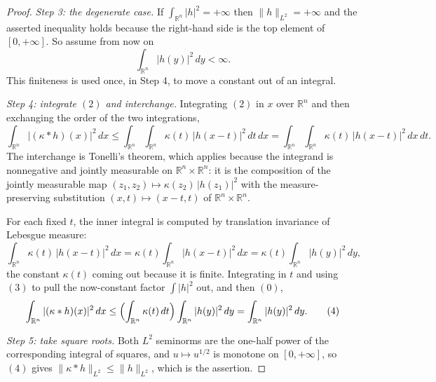\begin{proof}
\emph{Step 3: the degenerate case.}
If $\int_{\mathbb{R}^n}|h|^2 = +\infty$ then $\|h\|_{L^2} = +\infty$ and the
asserted inequality holds because the right-hand side is the top element of
$[0,+\infty]$.  So assume from now on
\begin{equation*}
  \int_{\mathbb{R}^n} |h(y)|^2 \, dy < \infty . \tag{3}
\end{equation*}
This finiteness is used once, in Step 4, to move a constant out of an integral.

\emph{Step 4: integrate $(2)$ and interchange.}
Integrating $(2)$ in $x$ over $\mathbb{R}^n$ and then exchanging the order of the
two integrations,
\[
  \int_{\mathbb{R}^n} |(\kappa*h)(x)|^2 \, dx
    \leq \int_{\mathbb{R}^n}\!\!\int_{\mathbb{R}^n} \kappa(t)\,|h(x-t)|^2 \, dt\, dx
    = \int_{\mathbb{R}^n}\!\!\int_{\mathbb{R}^n} \kappa(t)\,|h(x-t)|^2 \, dx\, dt .
\]
The interchange is Tonelli's theorem, which applies because the integrand is
nonnegative and jointly measurable on $\mathbb{R}^n \times \mathbb{R}^n$: it is
the composition of the jointly measurable map
$(z_1,z_2) \mapsto \kappa(z_2)\,|h(z_1)|^2$ with the measure-preserving
substitution $(x,t) \mapsto (x-t,t)$ of $\mathbb{R}^n\times\mathbb{R}^n$.

For each fixed $t$, the inner integral is computed by translation invariance of
Lebesgue measure:
\[
  \int_{\mathbb{R}^n} \kappa(t)\,|h(x-t)|^2 \, dx
    = \kappa(t) \int_{\mathbb{R}^n} |h(x-t)|^2 \, dx
    = \kappa(t) \int_{\mathbb{R}^n} |h(y)|^2 \, dy ,
\]
the constant $\kappa(t)$ coming out because it is finite.  Integrating in $t$ and
using $(3)$ to pull the now-constant factor $\int |h|^2$ out, and then $(0)$,
\begin{equation*}
  \int_{\mathbb{R}^n} |(\kappa*h)(x)|^2 \, dx
    \leq \Bigl(\int_{\mathbb{R}^n} \kappa(t)\,dt\Bigr)
        \int_{\mathbb{R}^n} |h(y)|^2\, dy
    = \int_{\mathbb{R}^n} |h(y)|^2 \, dy . \tag{4}
\end{equation*}

\emph{Step 5: take square roots.}
Both $L^2$ seminorms are the one-half power of the corresponding integral of
squares, and $u \mapsto u^{1/2}$ is monotone on $[0,+\infty]$, so $(4)$ gives
$\|\kappa*h\|_{L^2} \leq \|h\|_{L^2}$, which is the assertion.
\end{proof}
